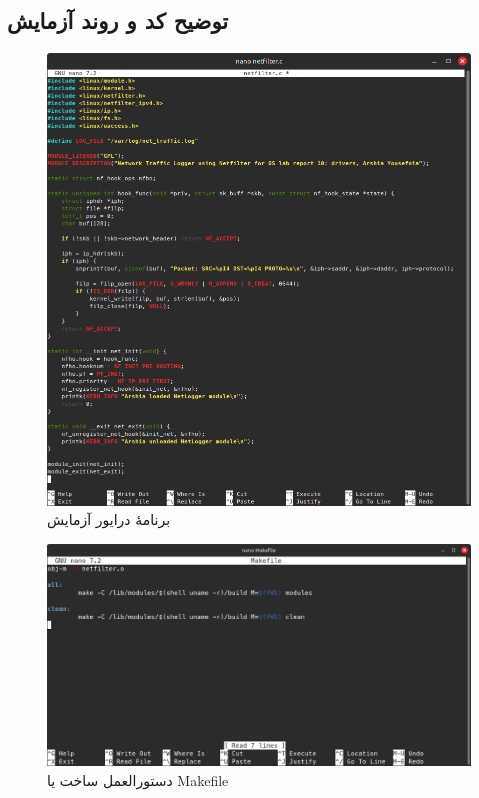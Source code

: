 \documentclass[12pt]{article}
\begin{document}
	\subsection{توضیح کد و روند آزمایش}
	\begin{figure}[H]
		\centering
		\includegraphics[width=\textwidth]{report10-resources/screenshots/4.png}
		\caption{برنامهٔ درایور آزمایش}
		\label{img:4}
	\end{figure}
	\begin{figure}[H]
		\centering
		\includegraphics[width=\textwidth]{report10-resources/screenshots/5.png}
		\caption{دستورالعمل ساخت یا \textenglish{Makefile}}
		\label{img:5}
	\end{figure}
\end{document}
